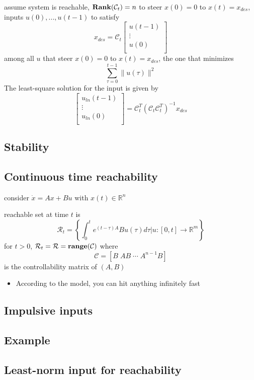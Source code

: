 \documentclass[10pt,letterpaper]{article}
\begin{document}
assume system is reachable, ${\bf Rank} (\mathcal C_t) = n$ to steer $x(0)=0$ to $x(t)= x _{des}$, inputs $u(0),...,u(t-1)$ to satisfy
$$
x _{des} = \mathcal C _{t}
\begin{bmatrix}
  u(t-1) \\
  \vdots \\
  u(0)   \\
\end{bmatrix}
$$
among all $u$ that steer $x(0)= 0$ to $x(t)= x _{des}$, the one that minimizes
$$
\sum ^{t-1} _{\tau=0} \| u(\tau) \| ^{2}
$$
The least-square solution for the input is given by
$$
\begin{bmatrix}
  u _{ln}(t-1) \\
  \vdots       \\
  u _{ln}(0)   \\
\end{bmatrix}
= \mathcal C ^{T} _{t} (\mathcal C _{t} \mathcal C^{T} _{t} ) ^{-1} x _{des} 
$$
\subsection{Stability}
\label{sec-18_4}
\subsection{Continuous time reachability}
\label{sec-18_5}

consider $\dot x = Ax+Bu$ with $x(t) \in \mathbb{R}^{n}$

reachable set at time $t$ is
$$
\mathcal R _{t} = \left\{ \int ^{t} _{0} e ^{(t-\tau)A} Bu(\tau) d\tau \left| u: \right. [0,t] \rightarrow \mathbb{R}^{m} \right\}
$$
for $t>0$, $\mathcal R _{t} = \mathcal R = {\bf range} (\mathcal C)$ where
$$
\mathcal C = [B \; AB \; \cdots \; A ^{n-1} B]
$$
is the controllability matrix of $(A,B)$
\begin{itemize}
\item According to the model, you can hit anything infinitely fast
\end{itemize}
\subsection{Impulsive inputs}
\label{sec-18_6}
\subsection{Example}
\label{sec-18_7}
\subsection{Least-norm input for reachability}
\label{sec-18_8}
\end{document}
